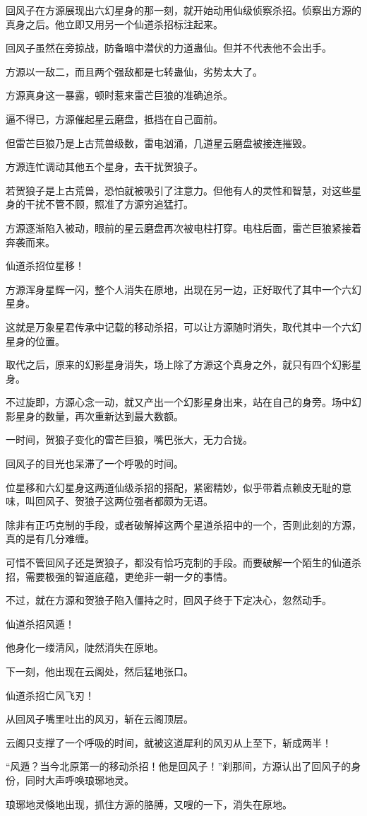 \begin{this_body}
回风子在方源展现出六幻星身的那一刻，就开始动用仙级侦察杀招。侦察出方源的真身之后。他立即又用另一个仙道杀招标注起来。

回风子虽然在旁掠战，防备暗中潜伏的力道蛊仙。但并不代表他不会出手。

方源以一敌二，而且两个强敌都是七转蛊仙，劣势太大了。

方源真身这一暴露，顿时惹来雷芒巨狼的准确追杀。

逼不得已，方源催起星云磨盘，抵挡在自己面前。

但雷芒巨狼乃是上古荒兽级数，雷电汹涌，几道星云磨盘被接连摧毁。

方源连忙调动其他五个星身，去干扰贺狼子。

若贺狼子是上古荒兽，恐怕就被吸引了注意力。但他有人的灵性和智慧，对这些星身的干扰不管不顾，照准了方源穷追猛打。

方源逐渐陷入被动，眼前的星云磨盘再次被电柱打穿。电柱后面，雷芒巨狼紧接着奔袭而来。

仙道杀招位星移！

方源浑身星辉一闪，整个人消失在原地，出现在另一边，正好取代了其中一个六幻星身。

这就是万象星君传承中记载的移动杀招，可以让方源随时消失，取代其中一个六幻星身的位置。

取代之后，原来的幻影星身消失，场上除了方源这个真身之外，就只有四个幻影星身。

不过旋即，方源心念一动，就又产出一个幻影星身出来，站在自己的身旁。场中幻影星身的数量，再次重新达到最大数额。

一时间，贺狼子变化的雷芒巨狼，嘴巴张大，无力合拢。

回风子的目光也呆滞了一个呼吸的时间。

位星移和六幻星身这两道仙级杀招的搭配，紧密精妙，似乎带着点赖皮无耻的意味，叫回风子、贺狼子这两位强者都颇为无语。

除非有正巧克制的手段，或者破解掉这两个星道杀招中的一个，否则此刻的方源，真的是有几分难缠。

可惜不管回风子还是贺狼子，都没有恰巧克制的手段。而要破解一个陌生的仙道杀招，需要极强的智道底蕴，更绝非一朝一夕的事情。

不过，就在方源和贺狼子陷入僵持之时，回风子终于下定决心，忽然动手。

仙道杀招风遁！

他身化一缕清风，陡然消失在原地。

下一刻，他出现在云阁处，然后猛地张口。

仙道杀招亡风飞刃！

从回风子嘴里吐出的风刃，斩在云阁顶层。

云阁只支撑了一个呼吸的时间，就被这道犀利的风刃从上至下，斩成两半！

“风遁？当今北原第一的移动杀招！他是回风子！”刹那间，方源认出了回风子的身份，同时大声呼唤琅琊地灵。

琅琊地灵倏地出现，抓住方源的胳膊，又嗖的一下，消失在原地。

\end{this_body}

